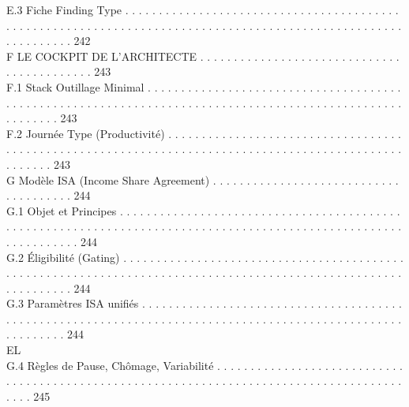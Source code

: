 \documentclass[12pt,landscape,a4paper]{article}
\begin{document}
E.3     Fiche Finding Type . . . . . . . . . . . . . . . . . . . . . . . . . . . . . . . . . . . . . . . . . . . . . . . . . . . . . . . . . . . . . . . . . . . . . . . . . . . . . . . . . . . . . . . . . . . . . . . . . . . . . . . . . . . . . . 242\\
\vspace{0.5em}
F     LE COCKPIT DE L’ARCHITECTE . . . . . . . . . . . . . . . . . . . . . . . . . . . . . . . . . . . . . . . . . . . 243\\
F.1     Stack Outillage Minimal . . . . . . . . . . . . . . . . . . . . . . . . . . . . . . . . . . . . . . . . . . . . . . . . . . . . . . . . . . . . . . . . . . . . . . . . . . . . . . . . . . . . . . . . . . . . . . . . . . . . . . . . . 243\\
F.2     Journée Type (Productivité) . . . . . . . . . . . . . . . . . . . . . . . . . . . . . . . . . . . . . . . . . . . . . . . . . . . . . . . . . . . . . . . . . . . . . . . . . . . . . . . . . . . . . . . . . . . . . . . . . . . . . 243\\
\vspace{0.5em}
G     Modèle ISA (Income Share Agreement) . . . . . . . . . . . . . . . . . . . . . . . . . . . . . . . . . . . . . . 244\\
G.1     Objet et Principes . . . . . . . . . . . . . . . . . . . . . . . . . . . . . . . . . . . . . . . . . . . . . . . . . . . . . . . . . . . . . . . . . . . . . . . . . . . . . . . . . . . . . . . . . . . . . . . . . . . . . . . . . . . . . . . . 244\\
G.2     Éligibilité (Gating) . . . . . . . . . . . . . . . . . . . . . . . . . . . . . . . . . . . . . . . . . . . . . . . . . . . . . . . . . . . . . . . . . . . . . . . . . . . . . . . . . . . . . . . . . . . . . . . . . . . . . . . . . . . . . . . 244\\
G.3     Paramètres ISA unifiés . . . . . . . . . . . . . . . . . . . . . . . . . . . . . . . . . . . . . . . . . . . . . . . . . . . . . . . . . . . . . . . . . . . . . . . . . . . . . . . . . . . . . . . . . . . . . . . . . . . . . . . . . . . 244\\
\vspace{0.5em}
\vspace{0.5em}
\vspace{0.5em}
\vspace{0.5em}
EL\\
G.4     Règles de Pause, Chômage, Variabilité . . . . . . . . . . . . . . . . . . . . . . . . . . . . . . . . . . . . . . . . . . . . . . . . . . . . . . . . . . . . . . . . . . . . . . . . . . . . . . . . . . . . . . . . . . . 245\\
\end{document}
